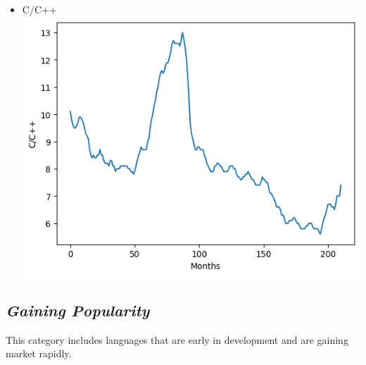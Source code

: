 \documentclass[conference]{IEEEtran}
\begin{document}
\begin{itemize}
\item{C/C++}
\includegraphics[scale=0.4]{lineplot/ccpp.png}
\end{itemize}

\subsection{\textit{Gaining Popularity}}
This category includes languages that are early in development and are gaining market rapidly.
\end{document}
